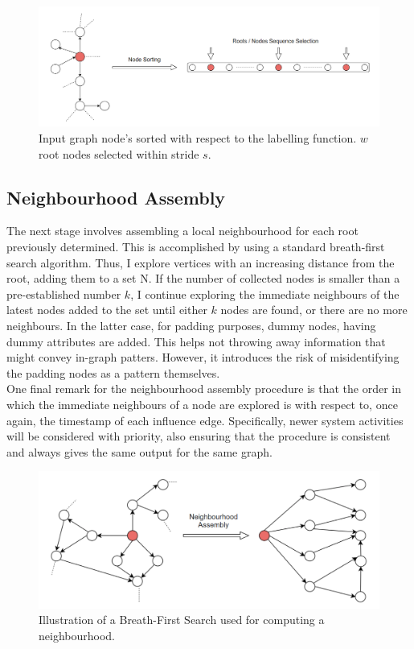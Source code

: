 \begin{figure}[H]
  \centering
  \includegraphics[scale=0.5]{Images/nodeseqsel.png}
  \caption{Input graph node's sorted with respect to the labelling function. $w$ root nodes selected within stride $s$.}
  \label{nodeseqsel}
\end{figure}

\subsection{Neighbourhood Assembly}

The next stage involves assembling a local neighbourhood for each root previously determined. This is accomplished by using a standard breath-first search algorithm. Thus, I explore vertices with an increasing distance from the root, adding them to a set N. If the number of collected nodes is smaller than a pre-established number $k$, I continue exploring the immediate neighbours of the latest nodes added to the set until either $k$ nodes are found, or there are no more neighbours. In the latter case, for padding purposes, dummy nodes, having dummy attributes are added. This helps not throwing away information that might convey in-graph patters. However, it introduces the risk of misidentifying the padding nodes as a pattern themselves. \\

One final remark for the neighbourhood assembly procedure is that the order in which the immediate neighbours of a node are explored is with respect to, once again, the timestamp of each influence edge. Specifically, newer system activities will be considered with priority, also ensuring that the procedure is consistent and always gives the same output for the same graph. \\

\begin{figure}[H]
  \centering
  \includegraphics[scale=0.375]{Images/neighassemb2.png}
  \caption{Illustration of a Breath-First Search used for computing a neighbourhood.}
  \label{neighassemb}
\end{figure}


